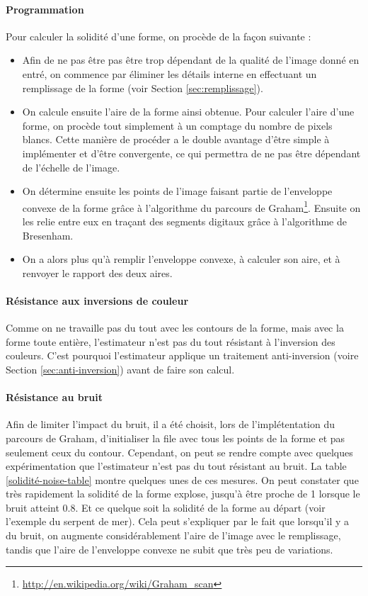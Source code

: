 \documentclass{article}
\theoremstyle{definition}
\begin{document}
	\paragraph{Programmation}
	
	  Pour calculer la solidité d'une forme, on procède de la façon suivante :
	  \begin{itemize}
	   \item Afin de ne pas être pas être trop dépendant de la qualité de l'image donné en entré, on commence par éliminer les détails interne en effectuant un remplissage de la forme (voir Section \ref{sec:remplissage}).
	   \item On calcule ensuite l'aire de la forme ainsi obtenue. Pour calculer l'aire d'une forme, on procède tout simplement à un comptage du nombre de pixels blancs. Cette manière de procéder a le double avantage d'être simple à implémenter et d'être convergente, ce qui permettra de ne pas être dépendant de l'échelle de l'image.
	   \item On détermine ensuite les points de l'image faisant partie de l'enveloppe convexe de la forme grâce à l'algorithme du parcours de Graham\footnote{\url{http://en.wikipedia.org/wiki/Graham_scan}}. Ensuite on les relie entre eux en traçant des segments digitaux grâce à l'algorithme de Bresenham.
	   \item On a alors plus qu'à remplir l'enveloppe convexe, à calculer son aire, et à renvoyer le rapport des deux aires.
	  \end{itemize}
  
  
	\paragraph{Résistance aux inversions de couleur}
	
	  Comme on ne travaille pas du tout avec les contours de la forme, mais avec la forme toute entière, l'estimateur n'est pas du tout résistant à l'inversion des couleurs. C'est pourquoi l'estimateur applique un traitement anti-inversion (voire Section \ref{sec:anti-inversion}) avant de faire son calcul.
	
	\paragraph{Résistance au bruit} Afin de limiter l'impact du bruit, il a été choisit, lors de l'implétentation du parcours de Graham, d'initialiser la file avec tous les points de la forme et pas seulement ceux du contour. Cependant, on peut se rendre compte avec quelques expérimentation que l'estimateur n'est pas du tout résistant au bruit. La table \ref{solidité-noise-table} montre quelques unes de ces mesures. On peut constater que très rapidement la solidité de la forme explose, jusqu'à être proche de 1 lorsque le bruit atteint 0.8. Et ce quelque soit la solidité de la forme au départ (voir l'exemple du serpent de mer). Cela peut s'expliquer par le fait que lorsqu'il y a du bruit, on augmente considérablement l'aire de l'image avec le remplissage, tandis que l'aire de l'enveloppe convexe ne subit que très peu de variations. \\
\end{document}
